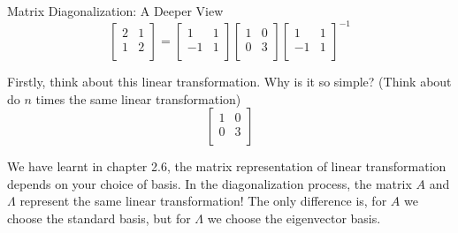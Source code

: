 \documentclass{beamer}
\begin{document}
        
        \begin{frame}{Matrix Diagonalization: A Deeper View}
            \begin{equation*}
                \left[ \begin{matrix}
                    2&		1\\
                    1&		2\\
                \end{matrix} \right] =\left[ \begin{matrix}
                    1&		1\\
                    -1&		1\\
                \end{matrix} \right] \left[ \begin{matrix}
                    1&		0\\
                    0&		3\\
                \end{matrix} \right] \left[ \begin{matrix}
                    1&		1\\
                    -1&		1\\
                \end{matrix} \right] ^{-1}
            \end{equation*}
        
        Firstly, think about this linear transformation. Why is it so simple? (Think about do $n$ times the same linear transformation)
        \begin{equation*}
            \left[ \begin{matrix}
                1&		0\\
                0&		3\\
            \end{matrix} \right]
        \end{equation*}
        
        We have learnt in chapter 2.6, the matrix representation of linear transformation depends on your choice of basis. In the diagonalization process, the matrix $A$ and $\varLambda$ represent the same linear transformation! The only difference is, for $A$ we choose the standard basis, but for $\varLambda$ we choose the eigenvector basis.
        \end{frame}
        
\end{document}
